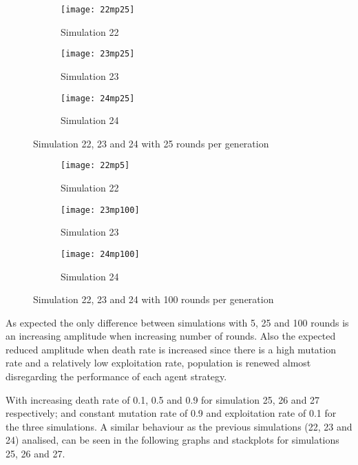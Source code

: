 \begin{figure}[H]       
    \centering
    \begin{subfigure}[b]{0.3\textwidth}
	\centering
	{\texttt{[image: 22mp25]}}   
    	\caption{Simulation 22}
	\label{fig:mpsim2225}
    \end{subfigure}
    \hfill
    \begin{subfigure}[b]{0.3\textwidth}
	\centering
	{\texttt{[image: 23mp25]}}   
    	\caption{Simulation 23}
	\label{fig:mpsim2325}
    \end{subfigure}
    \hfill
    \begin{subfigure}[b]{0.3\textwidth}
	\centering
	{\texttt{[image: 24mp25]}}   
    	\caption{Simulation 24}
	\label{fig:mpsim2425}
    \end{subfigure}
    \caption{Simulation 22, 23 and 24 with 25 rounds per generation}
    \label{mpsim222324simulations25}
\end{figure}


\begin{figure}[H]       
    \centering
    \begin{subfigure}[b]{0.3\textwidth}
	\centering
	{\texttt{[image: 22mp5]}}   
    	\caption{Simulation 22}
	\label{fig:mpsim225}
    \end{subfigure}
    \hfill
    \begin{subfigure}[b]{0.3\textwidth}
	\centering
	{\texttt{[image: 23mp100]}}   
    	\caption{Simulation 23}
	\label{fig:mpsim23100}
    \end{subfigure}
    \hfill
    \begin{subfigure}[b]{0.3\textwidth}
	\centering
	{\texttt{[image: 24mp100]}}   
    	\caption{Simulation 24}
	\label{fig:mpsim24100}
    \end{subfigure}
    \caption{Simulation 22, 23 and 24 with 100 rounds per generation}
    \label{mpsim222324simulations100}
\end{figure}

As expected the only difference between simulations with 5, 25 and 100 rounds is an increasing amplitude when increasing number of rounds. Also the expected reduced amplitude when death rate is increased since there is a high mutation rate and a relatively low exploitation rate, population is renewed almost disregarding the performance of each agent strategy.

With increasing death rate of 0.1, 0.5 and 0.9 for simulation 25, 26 and 27 respectively; and constant mutation rate of 0.9 and exploitation rate of 0.1 for the three simulations. A similar behaviour as the previous simulations (22, 23 and 24) analised, can be seen in the following graphs and stackplots for simulations 25, 26 and 27.

